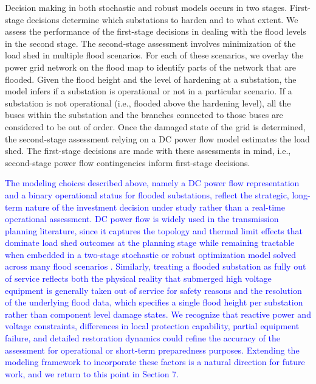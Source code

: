 \documentclass[authoryear,preprint,review,12pt]{elsarticle}\usepackage{amssymb}
\begin{document}
Decision making in both stochastic and robust models occurs in two stages. First-stage decisions determine which substations to harden and to what extent. We assess the performance of the first-stage decisions in dealing with the flood levels in the second stage. The second-stage assessment involves minimization of the load shed in multiple flood scenarios. For each of these scenarios, we overlay the power grid network on the flood map to identify parts of the network that are flooded. Given the flood height and the level of hardening at a substation, the model infers if a substation is operational or not in a particular scenario. If a substation is not operational (i.e., flooded above the hardening level), all the buses within the substation and the branches connected to those buses are considered to be out of order. Once the damaged state of the grid is determined, the second-stage assessment relying on a DC power flow model estimates the load shed. The first-stage decisions are made with these assessments in mind, i.e., second-stage power flow contingencies inform first-stage decisions. 


\textcolor{blue}{The modeling choices described above, namely a DC power flow representation and a binary operational status for flooded substations, reflect the strategic, long-term nature of the investment decision under study rather than a real-time operational assessment. DC power flow is widely used in the transmission planning literature, since it captures the topology and thermal limit effects that dominate load shed outcomes at the planning stage while remaining tractable when embedded in a two-stage stochastic or robust optimization model solved across many flood scenarios \cite{9842364, Coffrin2011,austgen_impacts_2025}. Similarly, treating a flooded substation as fully out of service reflects both the physical reality that submerged high voltage equipment is generally taken out of service for safety reasons and the resolution of the underlying flood data, which specifies a single flood height per substation rather than component level damage states. We recognize that reactive power and voltage constraints, differences in local protection capability, partial equipment failure, and detailed restoration dynamics could refine the accuracy of the assessment for operational or short-term preparedness purposes. Extending the modeling framework to incorporate these factors is a natural direction for future work, and we return to this point in Section 7.}
\end{document}
